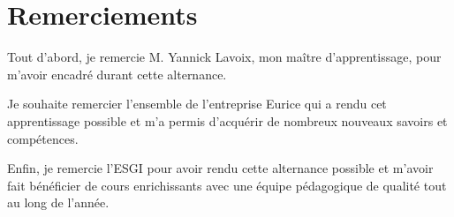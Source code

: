 \documentclass[11pt]{report}
\begin{document}
    \chapter*{Remerciements}
    Tout d’abord, je remercie M. Yannick Lavoix, mon maître d’apprentissage,
    pour m’avoir encadré durant cette alternance. 
    
    
    Je souhaite remercier l’ensemble de l’entreprise Eurice qui a
    rendu cet apprentissage possible et m’a permis d’acquérir de nombreux nouveaux
    savoirs et compétences.\newline
    
    Enfin, je remercie l'ESGI pour avoir rendu
    cette alternance possible et m’avoir fait bénéficier de cours enrichissants avec
    une équipe pédagogique de qualité tout au long de l’année. \newline

    \renewcommand{\baselinestretch}{1.30}\small \normalsize
    \tableofcontents
    \renewcommand{\baselinestretch}{1.18}\small \normalsize
    
    
    
    
    
    \printglossaries
    
    
    
\end{document}
